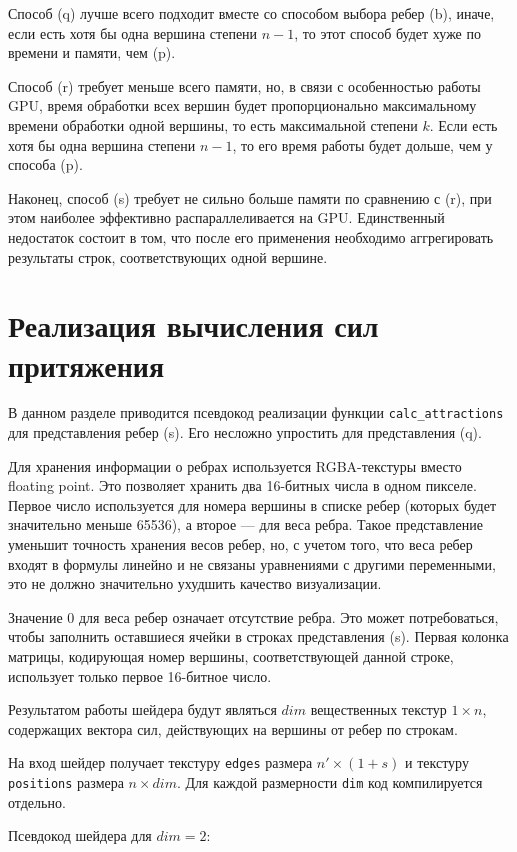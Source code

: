 Способ (q) лучше всего подходит вместе со способом выбора ребер (b), иначе, если есть хотя бы одна вершина степени $n-1$, то этот способ будет хуже по времени и памяти, чем (p).

Способ (r) требует меньше всего памяти, но, в связи с особенностью работы GPU, время обработки всех вершин будет пропорционально максимальному времени обработки одной вершины, то есть максимальной степени $k$. Если есть хотя бы одна вершина степени $n - 1$, то его время работы будет дольше, чем у способа (p).

Наконец, способ (s) требует не сильно больше памяти по сравнению с (r), при этом наиболее эффективно распараллеливается на GPU. Единственный недостаток состоит в том, что после его применения необходимо аггрегировать результаты строк, соответствующих одной вершине.

\section{Реализация вычисления сил притяжения}

В данном разделе приводится псевдокод реализации функции \texttt{calc\_attractions} для представления ребер (s). Его несложно упростить для представления (q).

Для хранения информации о ребрах используется RGBA-текстуры вместо floating point. Это позволяет хранить два 16-битных числа в одном пикселе. Первое число используется для номера вершины в списке ребер (которых будет значительно меньше 65536), а второе --- для веса ребра. Такое представление уменьшит точность хранения весов ребер, но, с учетом того, что веса ребер входят в формулы линейно и не связаны уравнениями с другими переменными, это не должно значительно ухудшить качество визуализации.

Значение 0 для веса ребер означает отсутствие ребра. Это может потребоваться, чтобы заполнить оставшиеся ячейки в строках представления (s). Первая колонка матрицы, кодирующая номер вершины, соответствующей данной строке, использует только первое 16-битное число.

Результатом работы шейдера будут являться $dim$ вещественных текстур $1\times n$, содержащих вектора сил, действующих на вершины от ребер по строкам.

На вход шейдер получает текстуру \texttt{edges} размера $n'\times(1 + s)$ и текстуру \texttt{positions} размера $n\times dim$. Для каждой размерности \texttt{dim} код компилируется отдельно.

Псевдокод шейдера для $dim = 2$:

